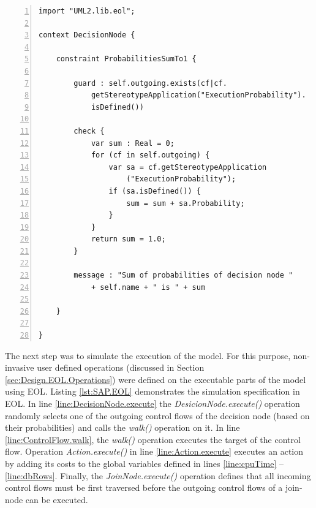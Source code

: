 \begin{lstlisting}[float=tbp, basicstyle=\ttfamily\footnotesize, flexiblecolumns=true, numbers=left, nolol=true, caption=Performance-Annotated Activity Diagram Constraints using EVL, label=lst:SAP.EVL, language=EVL, tabsize=2]
import "UML2.lib.eol";

context DecisionNode {
	
	constraint ProbabilitiesSumTo1 {
		
		guard : self.outgoing.exists(cf|cf.
			getStereotypeApplication("ExecutionProbability").
			isDefined())
		
		check {
			var sum : Real = 0;
			for (cf in self.outgoing) {
				var sa = cf.getStereotypeApplication
					("ExecutionProbability");
				if (sa.isDefined()) {
					sum = sum + sa.Probability;
				}
			}
			return sum = 1.0;
		}
		
		message : "Sum of probabilities of decision node " 
			+ self.name + " is " + sum 
		
	}
	
}
\end{lstlisting}

The next step was to simulate the execution of the model. For this purpose, non-invasive user defined operations (discussed in Section \ref{sec:Design.EOL.Operations}) were defined on the executable parts of the model using EOL. Listing \ref{lst:SAP.EOL} demonstrates the simulation specification in EOL. In line \ref{line:DecisionNode.execute} the \emph{DesicionNode.execute()} operation randomly selects one of the outgoing control flows of the decision node (based on their probabilities) and calls the \emph{walk()} operation on it. In line \ref{line:ControlFlow.walk}, the \emph{walk()} operation executes the target of the control flow. Operation \emph{Action.execute()} in line \ref{line:Action.execute} executes an action by adding its costs to the global variables defined in lines \ref{line:cpuTime} -- \ref{line:dbRows}. Finally, the \emph{JoinNode.execute()} operation defines that all incoming control flows must be first traversed before the outgoing control flows of a join-node can be executed.

